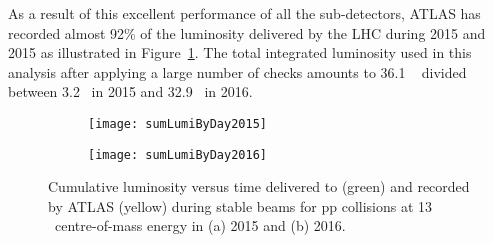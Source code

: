 As a result of this excellent performance of all the sub-detectors,
ATLAS has recorded  almost 92\% of the luminosity delivered by the LHC during 
2015 and 2015 as illustrated in  Figure~\ref{fig:exp.op.intlumi}.
The total integrated luminosity used in this analysis after 
applying a large number of checks amounts to 
 36.1 \ifb~ divided between 3.2 \ifb~in 2015 and 32.9 \ifb~in 2016.

\begin{figure}[t!]
\centering
\begin{subfigure}[t]{0.48\textwidth}
\texttt{[image: sumLumiByDay2015]}
\end{subfigure}
\begin{subfigure}[t]{0.48\textwidth}
\texttt{[image: sumLumiByDay2016]}
\end{subfigure}
\vspace{-0.3cm}
\caption{
Cumulative luminosity versus time delivered to (green) and recorded by ATLAS 
(yellow) during stable beams for pp collisions at 13 \TeV~centre-of-mass energy 
in (a) 2015 and (b) 2016.
}
\label{fig:exp.op.intlumi}
\end{figure} 



